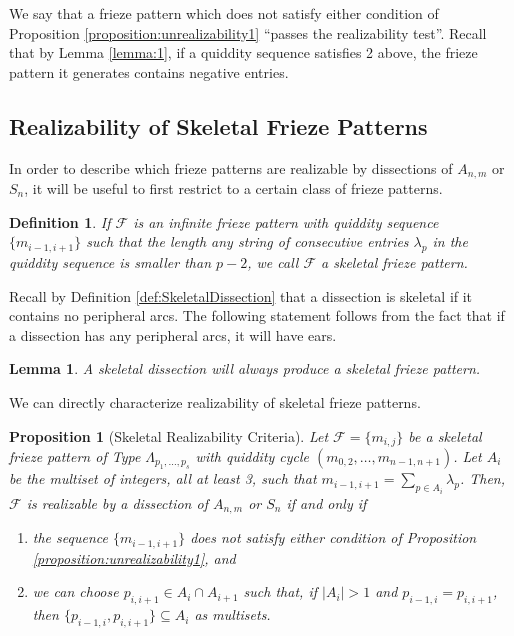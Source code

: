 \documentclass[12pt]{article}
\newtheorem{definition}{Definition}
\newtheorem{lemma}{Lemma}
\newtheorem{proposition}{Proposition}
\theoremstyle{remark}
\newcommand*{\F}{\mathcal{F}}
\begin{document}
We say that a frieze pattern which does not satisfy either condition of Proposition \ref{proposition:unrealizability1} ``passes the realizability test''.
Recall that by Lemma \ref{lemma:1}, if a quiddity sequence satisfies 2 above, the frieze pattern it generates contains negative entries. 


\subsection{Realizability of Skeletal Frieze Patterns}\label{subsec:RealizabilitySkeletal}

In order to describe which frieze patterns are realizable by dissections of $A_{n,m}$ or $S_n$, it will be useful to first restrict to a certain class of frieze patterns.

\begin{definition}
If $\F$ is an infinite frieze pattern with quiddity sequence $\{m_{i-1,i+1}\}$ such that the length any string of consecutive entries $\lambda_p$ in the quiddity sequence is smaller than $p-2$, we call $\F$ a \emph{skeletal frieze pattern}.
\end{definition}

Recall by Definition \ref{def:SkeletalDissection} that a dissection is skeletal if it contains no peripheral  arcs. The following statement follows from the fact that if a dissection has any peripheral arcs, it will have ears. 

\begin{lemma}\label{lem:SkeletalAgree}
A skeletal dissection will always produce a skeletal frieze pattern.
\end{lemma}

We can directly characterize realizability of skeletal frieze patterns. 

\begin{proposition}[Skeletal Realizability Criteria]\label{prop:realizability}
Let $\mathcal{F} = \{m_{i,j}\}$ be a skeletal frieze pattern of Type $\Lambda_{p_1,\ldots,p_s}$ with quiddity cycle $(m_{0,2},\ldots,m_{n-1,n+1})$. Let $A_i$ be the multiset of integers, all at least 3, such that $m_{i-1,i+1} = \sum_{p \in A_i} \lambda_p$. Then, $\mathcal{F}$ is realizable by a dissection of $A_{n,m}$ or $S_n$ if and only if 
\begin{enumerate}
    \item[i)] the sequence $\{m_{i-1,i+1}\}$ does not satisfy either condition of Proposition \ref{proposition:unrealizability1}, and 
    \item[ii)] we can choose $p_{i,i+1} \in A_i \cap A_{i+1}$ such that, if $\vert A_i \vert > 1$ and $p_{i-1,i} = p_{i,i+1}$, then $\{p_{i-1,i},p_{i,i+1}\} \subseteq A_i$ as multisets. 
\end{enumerate}
\end{proposition}
\end{document}
